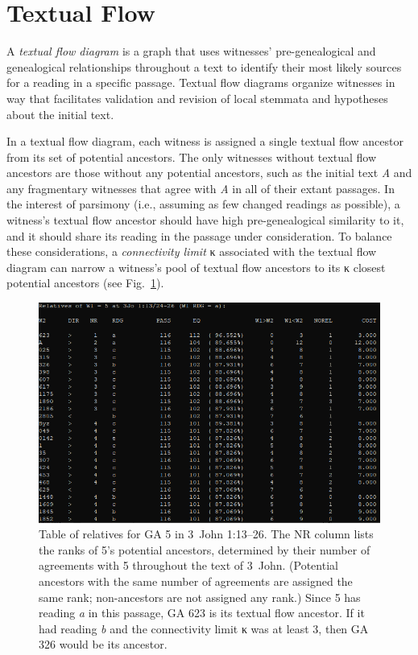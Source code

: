 \documentclass[a4paper, 12pt]{article}
\begin{document}
	\newpage
	
	\section{Textual Flow}\label{sec:textual-flow}
	A \emph{textual flow diagram} is a graph that uses witnesses' pre-genealogical and genealogical relationships throughout a text to identify their most likely sources for a reading in a specific passage. Textual flow diagrams organize witnesses in way that facilitates validation and revision of local stemmata and hypotheses about the initial text.
	
	In a textual flow diagram, each witness is assigned a single textual flow ancestor from its set of potential ancestors. The only witnesses without textual flow ancestors are those without any potential ancestors, such as the initial text \emph{A} and any fragmentary witnesses that agree with \emph{A} in all of their extant passages. In the interest of parsimony (i.e., assuming as few changed readings as possible), a witness's textual flow ancestor should have high pre-genealogical similarity to it, and it should share its reading in the passage under consideration. To balance these considerations, a \emph{connectivity limit} κ associated with the textual flow diagram can narrow a witness's pool of textual flow ancestors to its κ closest potential ancestors (see Fig.~\ref{fig:find-relatives}).
	
	\begin{figure}[h!]
		\centering
		\includegraphics[width=\textwidth]{../graphics/find-relatives.png}
		\caption{Table of relatives for GA 5 in 3~John 1:13–26. The \textsf{NR} column lists the ranks of 5's potential ancestors, determined by their number of agreements with 5 throughout the text of 3~John. (Potential ancestors with the same number of agreements are assigned the same rank; non-ancestors are not assigned any rank.) Since 5 has reading \emph{a} in this passage, GA 623 is its textual flow ancestor. If it had reading \emph{b} and the connectivity limit κ was at least 3, then GA 326 would be its ancestor.}
		\label{fig:find-relatives}
	\end{figure}
	
\end{document}
